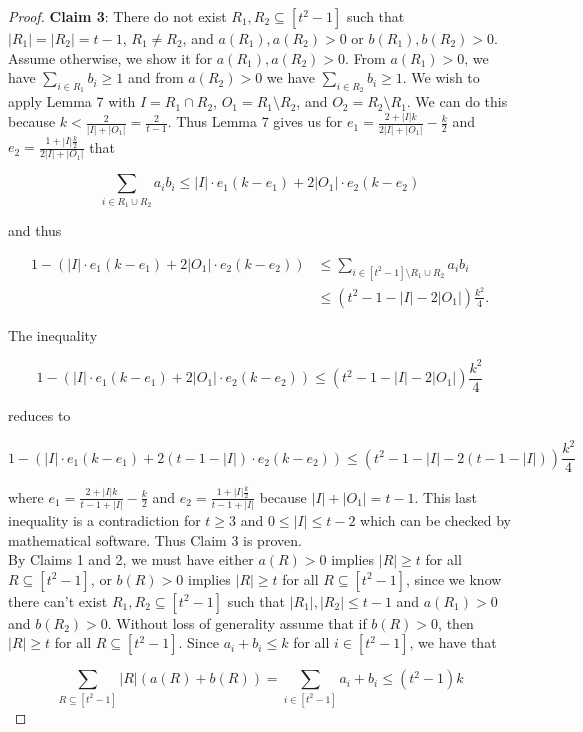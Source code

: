 \documentclass{article}
\begin{document}
\begin{proof}
\textbf{Claim 3}: There do not exist $R_1,R_2 \subseteq [t^2-1]$ such that $|R_1| = |R_2| = t-1$, $R_1 \neq R_2$, and $a(R_1), a(R_2) > 0$ or $b(R_1), b(R_2) > 0$. Assume otherwise, we show it for $a(R_1), a(R_2) > 0$. From $a(R_1) > 0$, we have $\sum_{i \in R_1} b_i \geq 1$ and from $a(R_2) > 0$ we have $\sum_{i \in R_2} b_i \geq 1$. We wish to apply Lemma 7 with $I = R_1 \cap R_2$, $O_1 = R_1 \setminus R_2$, and $O_2 = R_2 \setminus R_1$. We can do this because $k < \frac{2}{|I|+|O_1|} = \frac{2}{t-1}$. Thus Lemma 7 gives us for $e_1 = \frac{2+|I|k}{2|I|+|O_1|} - \frac{k}{2}$ and $e_2 = \frac{1+|I|\frac{k}{2}}{2|I| + |O_1|}$ that

$$\sum_{i \in R_1 \cup R_2} a_ib_i \leq |I| \cdot e_1(k-e_1) + 2|O_1| \cdot e_2(k - e_2)$$

and thus

\begin{align*}
1 - (|I| \cdot e_1(k-e_1) + 2|O_1| \cdot e_2(k - e_2)) &\leq \sum_{i \in [t^2-1] \setminus R_1 \cup R_2} a_ib_i \\
&\leq (t^2 - 1 - |I| -2|O_1|)\frac{k^2}{4}.
\end{align*}

The inequality

$$1 - (|I| \cdot e_1(k-e_1) + 2|O_1| \cdot e_2(k - e_2)) \leq (t^2 - 1 - |I| -2|O_1|)\frac{k^2}{4}$$

\noindent
reduces to

$$1 - (|I| \cdot e_1(k-e_1) + 2(t-1-|I|) \cdot e_2(k - e_2)) \leq (t^2 - 1 - |I| -2(t-1-|I|))\frac{k^2}{4}$$

\noindent
where $e_1 = \frac{2+|I|k}{t-1+|I|} - \frac{k}{2}$ and $e_2 = \frac{1+|I|\frac{k}{2}}{t-1+|I|}$ because $|I| + |O_1| = t-1$. This last inequality is a contradiction for $t \geq 3$ and $0 \leq |I| \leq t-2$ which can be checked by mathematical software. Thus Claim 3 is proven. \\

By Claims 1 and 2, we must have either $a(R) > 0$ implies $|R|  \geq t$ for all $R \subseteq [t^2-1]$, or $b(R) > 0$ implies $|R| \geq t$ for all $R \subseteq [t^2-1]$, since we know there can't exist $R_1,R_2 \subseteq [t^2-1]$ such that $|R_1|,|R_2| \leq t-1$ and $a(R_1) > 0$ and $b(R_2) > 0$. Without loss of generality assume that if $b(R) > 0$, then $|R| \geq t$ for all $R \subseteq [t^2-1]$. Since $a_i + b_i \leq k$ for all $i \in [t^2-1]$, we have that 

$$\sum_{R \subseteq [t^2-1]} |R|(a(R) + b(R)) = \sum_{i \in [t^2-1]} a_i + b_i \leq (t^2-1)k$$


\end{proof}
\end{document}
